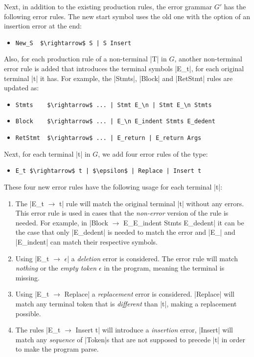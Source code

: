 Next, in addition to the existing production rules, the error grammar $G'$ has
the following error rules. The new start symbol uses the old one with the option
of an insertion error at the end:
\begin{itemize}
  \item \lstinline{New_S  $\rightarrow$ S | S Insert}
\end{itemize}
Also, for each production rule of a non-terminal |T| in $G$, another
non-terminal error rule is added that introduces the terminal symbols |E_t|, for
each original terminal |t| it has. For example, the |Stmts|, |Block| and
|RetStmt| rules are updated as:
\begin{itemize}
  \item \lstinline{Stmts    $\rightarrow$ ... | Stmt E_\n | Stmt E_\n Stmts}
  \item \lstinline{Block    $\rightarrow$ ... | E_\n E_indent Stmts E_dedent}
  \item \lstinline{RetStmt  $\rightarrow$ ... | E_return | E_return Args}
\end{itemize}
Next, for each terminal |t| in $G$, we add four error rules of the type:
\begin{itemize}
  \item \lstinline{E_t $\rightarrow$ t | $\epsilon$ | Replace | Insert t}
\end{itemize}
These four new error rules have the following usage for each terminal |t|:
\begin{enumerate}
  \item The |E_t $\rightarrow$ t| rule will match the original terminal |t| without any
  errors. This error rule is used in cases that the \emph{non-error} version of
  the rule is needed. For example, in \break
  |Block $\rightarrow$ E_\n E_indent Stmts E_dedent| it can be the case that only
  |E_dedent| is needed to match the error and |E_\n| and |E_indent| can match
  their respective symbols.
  \item Using |E_t $\rightarrow$ $\epsilon$| a \emph{deletion} error is considered. The
  error rule will match \emph{nothing} or the \emph{empty token} $\epsilon$ in
  the program, meaning the terminal is missing.
  \item Using |E_t $\rightarrow$ Replace| a \emph{replacement} error is considered.
  |Replace| will match any terminal token that is \emph{different} than |t|,
  making a replacement possible.
  \item  The rules |E_t $\rightarrow$ Insert t| will introduce a \emph{insertion} error,
  \ie |Insert| will match any \emph{sequence} of |Token|s that are not supposed
  to precede |t| in order to make the program parse.
\end{enumerate}
